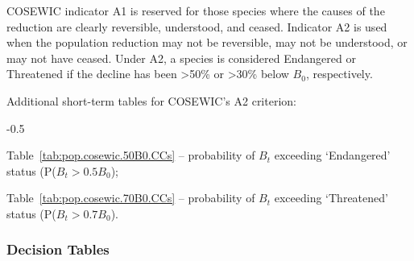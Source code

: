 \documentclass[11pt]{book}
\newcommand{\pc}{\%}
\begin{document}
COSEWIC indicator A1 is reserved for those species where the causes of the reduction are clearly reversible, understood, and ceased.
Indicator A2 is used when the population reduction may not be reversible, may not be understood, or may not have ceased.
Under A2, a species is considered Endangered or Threatened if the decline has been >50\pc{} or >30\pc{} below $B_0$, respectively.

Additional short-term tables for COSEWIC's A2 criterion:
\begin{itemize_csas}{-0.5}{}
\item Table~\ref{tab:pop.cosewic.50B0.CCs}  -- probability of $B_t$ exceeding `Endangered' status (P($B_t > 0.5B_0$);
\item Table~\ref{tab:pop.cosewic.70B0.CCs}  -- probability of $B_t$ exceeding `Threatened' status (P($B_t > 0.7B_0$).
\end{itemize_csas}


\subsubsection{Decision Tables}

\setlength{\tabcolsep}{0pt}%
\renewcommand*{\arraystretch}{1.0}
\end{document}
